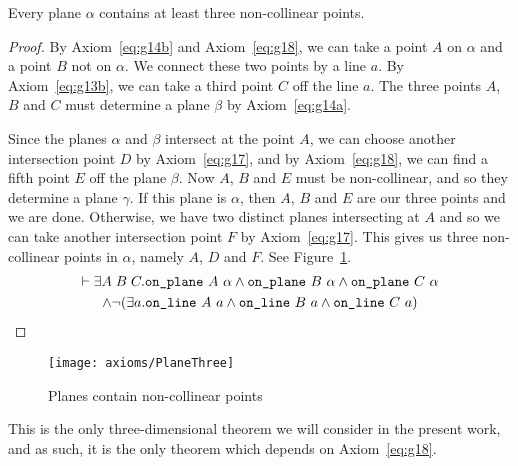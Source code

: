 \label{sec:PlaneThree}
\begin{proposition}\label{eq:PlaneThree}
Every plane $\alpha$ contains at least three non-collinear points.
\end{proposition}
\begin{proof}
By Axiom~\ref{eq:g14b} and Axiom~\ref{eq:g18}, we can take a point $A$ on $\alpha$ and a point $B$ not on $\alpha$. We connect these two points by a line $a$. By Axiom~\ref{eq:g13b}, we can take a third point $C$ off the line $a$. The three points $A$, $B$ and $C$ must determine a plane $\beta$ by Axiom~\ref{eq:g14a}.

Since the planes $\alpha$ and $\beta$ intersect at the point $A$, we can choose another intersection point $D$ by Axiom~\ref{eq:g17}, and by Axiom~\ref{eq:g18}, we can find a fifth point $E$ off the plane $\beta$. Now $A$, $B$ and $E$ must be non-collinear, and so they determine a plane $\gamma$. If this plane is $\alpha$, then $A$, $B$ and $E$ are our three points and we are done. Otherwise, we have two distinct planes intersecting at $A$ and so we can take another intersection point $F$ by Axiom~\ref{eq:g17}. This gives us three non-collinear points in $\alpha$, namely $A$, $D$ and $F$. See Figure~\ref{fig:PlaneThree}.
\begin{multline*}
\vdash\exists A\;B\;C. \texttt{on\_plane}\ A\ \alpha \wedge \texttt{on\_plane}\ B\ \alpha \wedge \texttt{on\_plane}\ C\ \alpha\\
\wedge\neg(\exists a.\texttt{on\_line}\ A\ a\wedge \texttt{on\_line}\ B\ a\wedge \texttt{on\_line}\ C\ a)
\end{multline*}
\end{proof}
\begin{figure}
\centering\texttt{[image: axioms/PlaneThree]}
\caption{Planes contain non-collinear points}
\label{fig:PlaneThree}
\end{figure}

This is the only three-dimensional theorem we will consider in the present work, and as such, it is the only theorem which depends on Axiom~\ref{eq:g18}.

